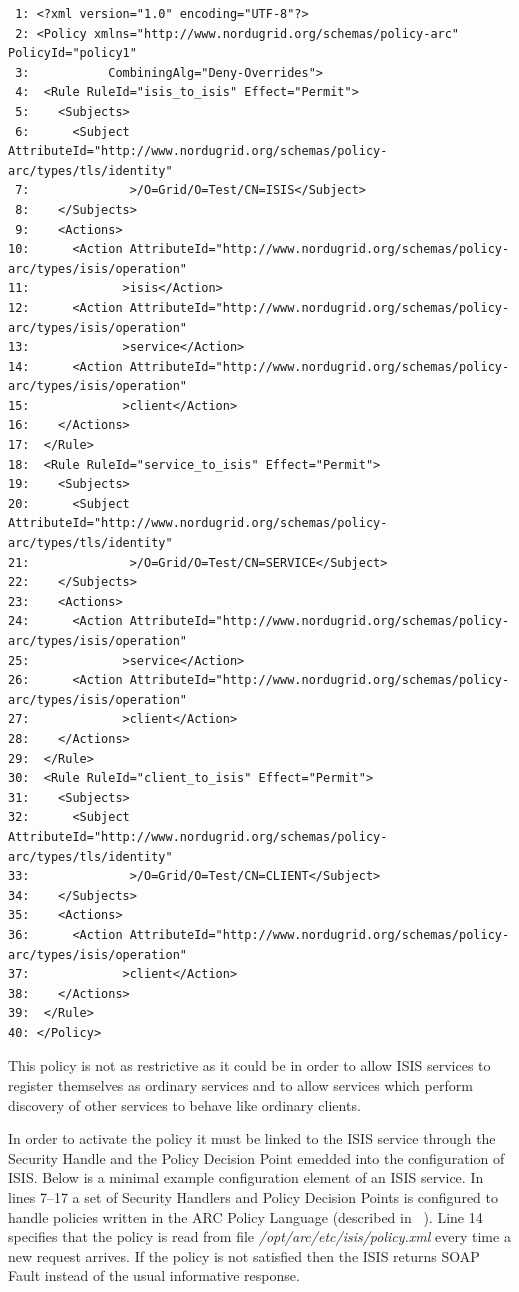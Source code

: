 \documentclass{book}
\begin{document}
\begin{verbatim}
 1: <?xml version="1.0" encoding="UTF-8"?>
 2: <Policy xmlns="http://www.nordugrid.org/schemas/policy-arc" PolicyId="policy1"
 3:           CombiningAlg="Deny-Overrides">
 4:  <Rule RuleId="isis_to_isis" Effect="Permit">
 5:    <Subjects>
 6:      <Subject AttributeId="http://www.nordugrid.org/schemas/policy-arc/types/tls/identity"
 7:              >/O=Grid/O=Test/CN=ISIS</Subject>
 8:    </Subjects>
 9:    <Actions>
10:      <Action AttributeId="http://www.nordugrid.org/schemas/policy-arc/types/isis/operation"
11:             >isis</Action>
12:      <Action AttributeId="http://www.nordugrid.org/schemas/policy-arc/types/isis/operation"
13:             >service</Action>
14:      <Action AttributeId="http://www.nordugrid.org/schemas/policy-arc/types/isis/operation"
15:             >client</Action>
16:    </Actions>
17:  </Rule>
18:  <Rule RuleId="service_to_isis" Effect="Permit">
19:    <Subjects>
20:      <Subject AttributeId="http://www.nordugrid.org/schemas/policy-arc/types/tls/identity"
21:              >/O=Grid/O=Test/CN=SERVICE</Subject>
22:    </Subjects>
23:    <Actions>
24:      <Action AttributeId="http://www.nordugrid.org/schemas/policy-arc/types/isis/operation"
25:             >service</Action>
26:      <Action AttributeId="http://www.nordugrid.org/schemas/policy-arc/types/isis/operation"
27:             >client</Action>
28:    </Actions>
29:  </Rule>
30:  <Rule RuleId="client_to_isis" Effect="Permit">
31:    <Subjects>
32:      <Subject AttributeId="http://www.nordugrid.org/schemas/policy-arc/types/tls/identity"
33:              >/O=Grid/O=Test/CN=CLIENT</Subject>
34:    </Subjects>
35:    <Actions>
36:      <Action AttributeId="http://www.nordugrid.org/schemas/policy-arc/types/isis/operation"
37:             >client</Action>
38:    </Actions>
39:  </Rule>
40: </Policy>

\end{verbatim}

This policy is not as restrictive as it could be in order to allow ISIS services to register themselves as ordinary 
services and to allow services which perform discovery of other services to behave like ordinary clients.

In order to activate the policy it must be linked to the ISIS service through the Security Handle and the Policy 
Decision Point emedded into the configuration of ISIS. Below is a minimal example configuration element of 
an ISIS service. In lines 7--17 a set of Security Handlers and Policy Decision Points is configured to handle
policies written in the ARC Policy Language (described in ~\cite{arcsec}). Line 14 specifies that the policy is 
read from file \textit{/opt/arc/etc/isis/policy.xml} every time a new request arrives. If the policy is not 
satisfied then the ISIS returns SOAP Fault instead of the usual informative response.
\end{document}
